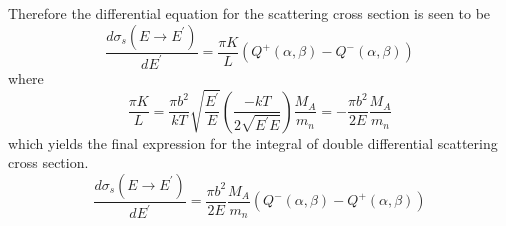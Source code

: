 Therefore the differential equation for the scattering cross section is seen to be
\begin{equation}
\label{app_int_qe_pre}
\frac{d\sigma_s(E\to E^\prime)}{dE^\prime} = 
    \frac{\pi K}{L} \left(Q^+(\alpha, \beta) - Q^-(\alpha, \beta) \right) 
\end{equation}
where 
\begin{equation}
\label{app_pi_K_L}
\frac{\pi K}{L} = \frac{\pi b^2}{kT} \sqrt{\frac{E^\prime}{E}} \left(\frac{-kT}{2\sqrt{E^\prime E}}\right) \frac{M_A}{m_n}
                = - \frac{\pi b^2}{2E} \frac{M_A}{m_n}
\end{equation}
which yields the final expression for the integral of double differential scattering cross section.
\begin{equation}
\label{app_int_qe_pre}
\frac{d\sigma_s(E\to E^\prime)}{dE^\prime} = 
    \frac{\pi b^2}{2E} \frac{M_A}{m_n}
    \left(Q^-(\alpha, \beta) - Q^+(\alpha, \beta) \right) 
\end{equation}
